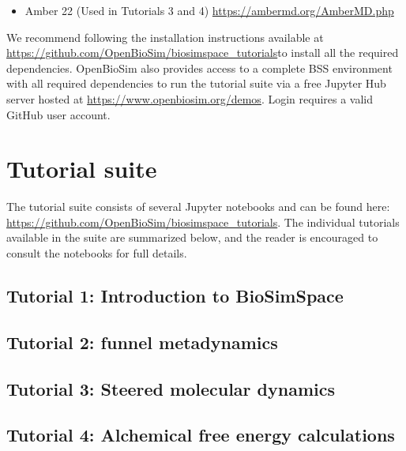 \documentclass[9pt,tutorial,pubversion]{livecoms}
\newcommand{\githubrepository}{\url{https://github.com/OpenBioSim/biosimspace_tutorials}}  %
\begin{document}
\begin{itemize}
    \item Amber 22 (Used in Tutorials 3 and 4) \url{https://ambermd.org/AmberMD.php}
\end{itemize}

We recommend following the installation instructions available at \githubrepository to install all the required dependencies.
OpenBioSim also provides access to a complete BSS environment with all required dependencies to run the tutorial suite via a free Jupyter Hub server hosted at \url{https://www.openbiosim.org/demos}. Login requires a valid GitHub user account. 

\section{Tutorial suite}

The tutorial suite consists of several Jupyter notebooks and can be found here: \url{https://github.com/OpenBioSim/biosimspace_tutorials}. The individual tutorials available in the suite are summarized below, and the reader is encouraged to consult the notebooks for full details.

\subsection{Tutorial 1: Introduction to BioSimSpace}


\subsection{Tutorial 2: funnel metadynamics}


\subsection{Tutorial 3: Steered molecular dynamics}


\subsection{Tutorial 4: Alchemical free energy calculations}

\end{document}
